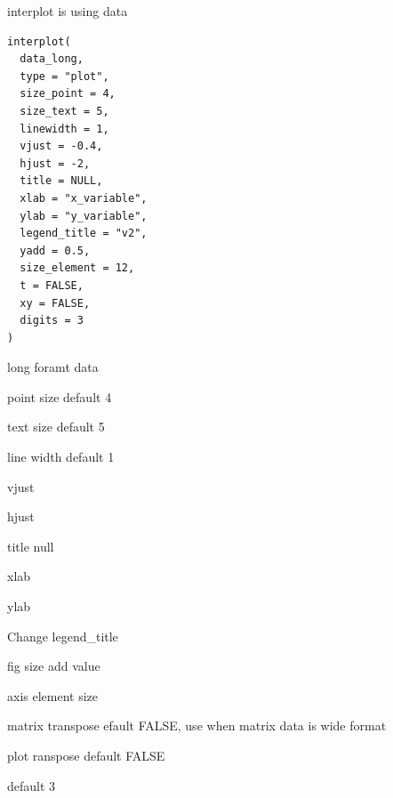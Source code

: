 \documentclass[a4paper]{book}
\begin{document}
%
\begin{Description}
interplot is using data
\end{Description}
%
\begin{Usage}
\begin{verbatim}
interplot(
  data_long,
  type = "plot",
  size_point = 4,
  size_text = 5,
  linewidth = 1,
  vjust = -0.4,
  hjust = -2,
  title = NULL,
  xlab = "x_variable",
  ylab = "y_variable",
  legend_title = "v2",
  yadd = 0.5,
  size_element = 12,
  t = FALSE,
  xy = FALSE,
  digits = 3
)
\end{verbatim}
\end{Usage}
%
\begin{Arguments}
\begin{ldescription}
\item[\code{data\_long}] long foramt data

\item[\code{size\_point}] point size default 4

\item[\code{size\_text}] text size  default 5

\item[\code{linewidth}] line width default 1

\item[\code{vjust}] vjust

\item[\code{hjust}] hjust

\item[\code{title}] title null

\item[\code{xlab}] xlab

\item[\code{ylab}] ylab

\item[\code{legend\_title}] Change legend\_title

\item[\code{yadd}] fig size add value

\item[\code{size\_element}] axis element size

\item[\code{t}] matrix transpose efault FALSE, use when matrix data is wide format

\item[\code{xy}] plot ranspose default FALSE

\item[\code{digits}] default 3
\end{ldescription}
\end{Arguments}
\end{document}
